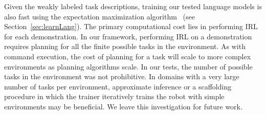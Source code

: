 \documentclass[conference]{IEEEtran}
\begin{document}
Given the weakly labeled task descriptions, training our tested language models is also fast using the expectation maximization algorithm~\cite{dempster77} (see Section~\ref{sec:learnLang}). The primary computational cost lies in performing IRL for each demonstration. In our framework, performing IRL on a demonstration requires planning for all the finite possible tasks in the environment. As with command execution, the cost of planning for a task will scale to more complex environments as planning algorithms scale. In our tests, the number of possible tasks in the environment was not prohibitive. In domains with a very large number of tasks per environment, approximate inference or a scaffolding procedure in which the trainer iteratively trains the robot with simple environments may be beneficial. We leave this investigation for future work. 
\end{document}
